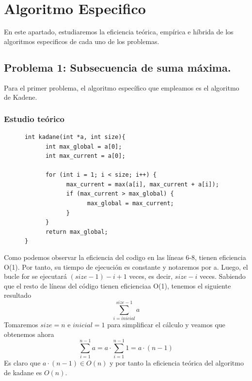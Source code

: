 \documentclass[11pt,openany]{book}
\begin{document}
\chapter{Algoritmo Especifico}
En este apartado, estudiaremos la eficiencia teórica, empírica e híbrida de los algoritmos especificos
de cada uno de los problemas.
\section{Problema 1: Subsecuencia de suma máxima.}
Para el primer problema, el algoritmo específico que empleamos es el algoritmo de Kadene.
\subsection{Estudio teórico}
\begin{lstlisting}
      int kadane(int *a, int size){
            int max_global = a[0];
            int max_current = a[0];

            for (int i = 1; i < size; i++) {
                  max_current = max(a[i], max_current + a[i]);
                  if (max_current > max_global) {
                        max_global = max_current;
                  }
            }
            return max_global;
      }
\end{lstlisting}
Como podemos observar la eficiencia del codigo en las líneas 6-8, tienen eficiencia O(1). Por tanto,
su tiempo de ejecución es constante y notaremos por a. Luego, el bucle for se ejecutará  $(size-1)-i+1 $
veces, es decir, $size-i$ veces. Sabiendo que el resto de líneas del código tienen eficienciaa O(1), tenemos
el siguiente resultado
\begin{equation*}
      \sum_{i=inicial}^{size-1} a
\end{equation*}
Tomaremos $size =  n$ e $inicial = 1$ para simplificar el cálculo y veamos que obtenemos ahora
\begin{equation*}
      \sum_{i=1}^{n-1} a = a \cdot \sum_{i=1}^{n-1} 1= a \cdot (n-1)
\end{equation*}
Es claro que $a \cdot (n-1) \in O(n)$ y por tanto la eficiencia teórica del algoritmo de kadane es $O(n)$.
\end{document}
